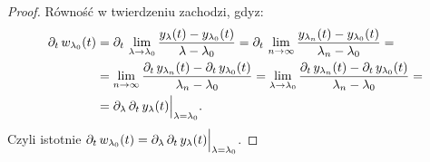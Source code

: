 \begin{proof}
		Równość w twierdzeniu zachodzi, gdyz:
		\begin{align*}
		\pd{t} w_{\l_0}(t) &= \pd{t} \lim_{\l \to \l_0}  \frac{ y_\l(t) - y_{\l_0}(t) }{ \l - \l_0 } = \pd{t} \lim_{n \to \infty}
		\frac{ y_{\l_n}(t) - y_{\l_0}(t) }{ \l_n - \l_0 } = \\
		&= \lim_{n \to \infty} \frac{  \pd{t} y_{\l_n}(t) -  \pd{t} y_{\l_0}(t) }{ \l_n - \l_0 } = \lim_{\l \to \l_0} \frac{  \pd{t} y_{\l_n}(t) -  \pd{t} y_{\l_0}(t) }{ \l_n - \l_0 } = \\
		& = \pd{\l } \pd{t} y_\l (t) \Big\vert_{ \l = \l_0 } \text{.}
		\end{align*}
		Czyli istotnie $\pd{t} w_{\l_0}(t) = \pd{\l } \pd{t} y_\l (t) \Big\vert_{ \l = \l_0 }$.
	\end{proof}


























